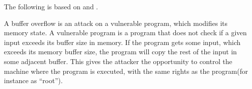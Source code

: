 The following is based on \citet[p. 18]{foster2005buffer} and \citet[Section 1.1]{ruwase2004practical}.

A buffer overflow is an attack on a vulnerable program, which modifies its memory state.
A vulnerable program is a program that does not check if a given input exceeds its buffer size in memory.
If the program gets some input, which exceeds its memory buffer size, the program will copy the rest of the input in some adjacent buffer.
This gives the attacker the opportunity to control the machine where the program is executed, with the same rights as the program(for instance as ``root'').

